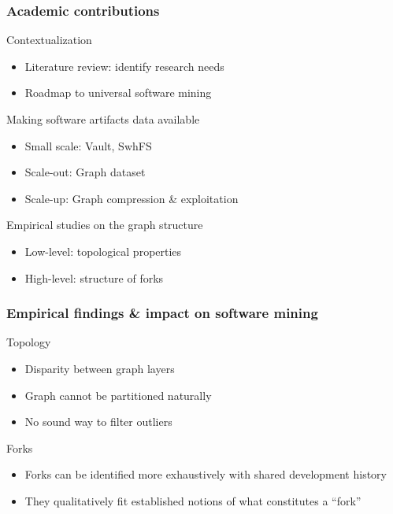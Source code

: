 \documentclass[aspectratio=169,xcolor=table]{beamer}
\begin{document}
    \begin{frame}
        \frametitle{Academic contributions}

        \begin{block}{Contextualization}
            \begin{itemize}
                \item Literature review: identify research needs
                \item Roadmap to universal software mining
            \end{itemize}
        \end{block}

        \begin{block}{Making software artifacts data available}
            \begin{itemize}
                \item Small scale: Vault, SwhFS
                \item Scale-out: Graph dataset
                \item Scale-up: Graph compression \& exploitation
            \end{itemize}
        \end{block}

        \begin{block}{Empirical studies on the graph structure}
            \begin{itemize}
                \item Low-level: topological properties
                \item High-level: structure of forks
            \end{itemize}
        \end{block}
    \end{frame}

    \begin{frame}
        \frametitle{Empirical findings \& impact on software mining}
        \begin{block}{Topology}
            \begin{itemize}
                \item Disparity between graph layers
                \item Graph cannot be partitioned naturally
                \item No sound way to filter outliers
            \end{itemize}
        \end{block}
        \begin{block}{Forks}
            \begin{itemize}
                \item Forks can be identified more exhaustively with shared
                    development history
                \item They qualitatively fit established notions of what constitutes a ``fork''
            \end{itemize}
        \end{block}
    \end{frame}
\end{document}
